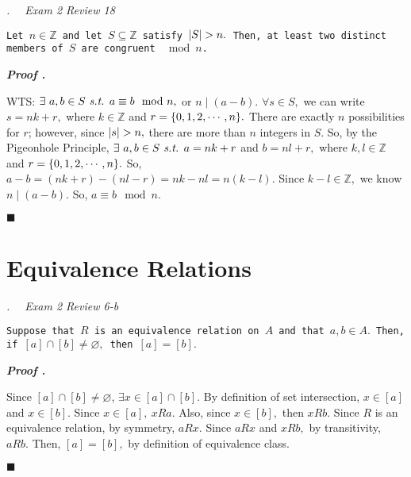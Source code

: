 \documentclass[11pt,letter]{article}
\newcounter{nq}[section]
\newcounter{np}[section]
\newenvironment*{p}{\par\noindent\textbf{\textit{Proof \stepcounter{np}\thenp. }}\par}{\par\hfill $\blacksquare$\par}
\newenvironment*{q}[1]{\noindent\emph{\thesection.\stepcounter{nq}\thenq$\quad $ #1}\par\noindent\texttt}{}
\def\Z{{\mathbb{Z}}}
\def\emptyset{\varnothing}
\def\st{\emph{ s.t. }}
\begin{document}
\begin{framed}\begin{q}
	{Exam 2 Review 18}
	{Let $n\in\Z$ and let $S\subseteq\Z$ satisfy $\qty|S|>n.$ Then, at least two distinct members of $S$ are congruent $\mod n$.}
\end{q}\end{framed}
\begin{p}
	WTS: $\exists\ a,b\in S\st a\equiv b\mod n,$ or $n\mid(a-b).$ $\forall s\in S,$ we can write $s=nk+r,$ where $k\in\Z$ and $r=\qty{0,1,2,\cdots,n}.$ There are exactly $n$ possibilities for $r$; however, since $\qty|s|>n,$ there are more than $n$ integers in $S$. So, by the Pigeonhole Principle, $\exists\ a,b\in S\st a=nk+r$ and $b=nl+r,$ where $k,l\in\Z$ and $r=\qty{0,1,2,\cdots,n}.$ So, $a-b=(nk+r)-(nl-r)=nk-nl=n(k-l).$ Since $k-l\in\Z,$ we know $n\mid(a-b).$ So, $a\equiv b\mod n.$
\end{p}

\newpage
\section{Equivalence Relations}
\begin{framed}\begin{q}
	{Exam 2 Review 6-b}
	{Suppose that $R$ is an equivalence relation on $A$ and that $a,b\in A.$ Then, if $[a]\cap[b]\neq\emptyset,$ then $[a]=[b].$}
\end{q}\end{framed}
\begin{p}
	Since $[a]\cap[b]\neq\emptyset$, $\exists x\in[a]\cap[b].$ By definition of set intersection, $x\in[a]$ and $x\in[b].$ Since $x\in[a],\ xRa.$ Also, since $x\in[b],$ then $xRb.$ Since $R$ is an equivalence relation, by symmetry, $aRx.$ Since $aRx$ and $xRb,$ by transitivity, $aRb.$ Then, $[a]=[b],$ by definition of equivalence class.	
\end{p}
\end{document}
